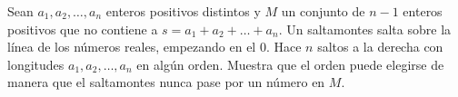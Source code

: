 Sean $a_1, a_2, \ldots , a_n$ enteros positivos distintos y $M$ un conjunto de $n-1$ enteros positivos que no contiene a $s=a_1 + a_2 + \ldots + a_n.$ Un saltamontes salta sobre la línea de los números reales, empezando en el $0$. Hace $n$ saltos a la derecha con longitudes $a_1, a_2, \ldots , a_n$ en algún orden. Muestra que el orden puede elegirse de manera que el saltamontes nunca pase por un número en $M$.
